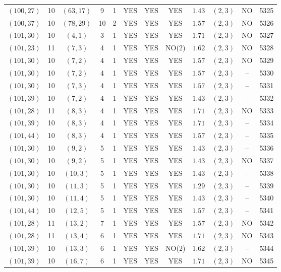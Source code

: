 \begin{longtable}{|c|c|c|c|c|c|c|c|c|c|c|c|}
$(100,27)$ & 10 & $(63,17)$ & 9 & 1 & YES & YES & YES & $1.43$ & $(2,3)$ & NO & 5325\\
$(100,37)$ & 10 & $(78,29)$ & 10 & 2 & YES & YES & YES & $1.57$ & $(2,3)$ & NO & 5326\\
$(101,30)$ & 10 & $(4,1)$ & 3 & 1 & YES & YES & YES & $1.71$ & $(2,3)$ & NO & 5327\\
$(101,23)$ & 11 & $(7,3)$ & 4 & 1 & YES & YES & NO(2) & $1.62$ & $(2,3)$ & NO & 5328\\
$(101,30)$ & 10 & $(7,2)$ & 4 & 1 & YES & YES & YES & $1.57$ & $(2,3)$ & NO & 5329\\
$(101,30)$ & 10 & $(7,2)$ & 4 & 1 & YES & YES & YES & $1.57$ & $(2,3)$ & -- & 5330\\
$(101,30)$ & 10 & $(7,3)$ & 4 & 1 & YES & YES & YES & $1.57$ & $(2,3)$ & -- & 5331\\
$(101,39)$ & 10 & $(7,2)$ & 4 & 1 & YES & YES & YES & $1.43$ & $(2,3)$ & -- & 5332\\
$(101,28)$ & 11 & $(8,3)$ & 4 & 1 & YES & YES & YES & $1.71$ & $(2,3)$ & NO & 5333\\
$(101,39)$ & 10 & $(8,3)$ & 4 & 1 & YES & YES & YES & $1.71$ & $(2,3)$ & -- & 5334\\
$(101,44)$ & 10 & $(8,3)$ & 4 & 1 & YES & YES & YES & $1.57$ & $(2,3)$ & -- & 5335\\
$(101,30)$ & 10 & $(9,2)$ & 5 & 1 & YES & YES & YES & $1.43$ & $(2,3)$ & -- & 5336\\
$(101,30)$ & 10 & $(9,2)$ & 5 & 1 & YES & YES & YES & $1.43$ & $(2,3)$ & NO & 5337\\
$(101,30)$ & 10 & $(10,3)$ & 5 & 1 & YES & YES & YES & $1.43$ & $(2,3)$ & -- & 5338\\
$(101,30)$ & 10 & $(11,3)$ & 5 & 1 & YES & YES & YES & $1.29$ & $(2,3)$ & -- & 5339\\
$(101,30)$ & 10 & $(11,4)$ & 5 & 1 & YES & YES & YES & $1.43$ & $(2,3)$ & -- & 5340\\
$(101,44)$ & 10 & $(12,5)$ & 5 & 1 & YES & YES & YES & $1.57$ & $(2,3)$ & -- & 5341\\
$(101,28)$ & 11 & $(13,2)$ & 7 & 1 & YES & YES & YES & $1.57$ & $(2,3)$ & NO & 5342\\
$(101,28)$ & 11 & $(13,4)$ & 6 & 1 & YES & YES & YES & $1.71$ & $(2,3)$ & NO & 5343\\
$(101,39)$ & 10 & $(13,3)$ & 6 & 1 & YES & YES & NO(2) & $1.62$ & $(2,3)$ & -- & 5344\\
$(101,39)$ & 10 & $(16,7)$ & 6 & 1 & YES & YES & YES & $1.71$ & $(2,3)$ & NO & 5345\\

\end{longtable}
